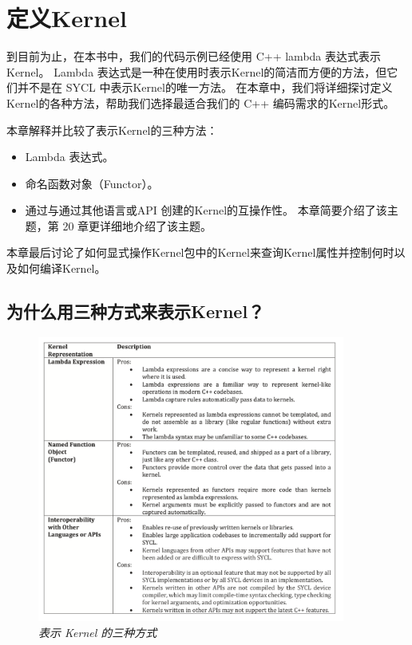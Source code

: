 \section{定义Kernel}
到目前为止，在本书中，我们的代码示例已经使用 C++ lambda 表达式表示Kernel。 
Lambda 表达式是一种在使用时表示Kernel的简洁而方便的方法，但它们并不是在 SYCL 中表示Kernel的唯一方法。 
在本章中，我们将详细探讨定义Kernel的各种方法，帮助我们选择最适合我们的 C++ 编码需求的Kernel形式。

本章解释并比较了表示Kernel的三种方法：

\begin{itemize}
	\item Lambda 表达式。

	\item 命名函数对象（Functor）。

	\item 通过与通过其他语言或API 创建的Kernel的互操作性。 本章简要介绍了该主题，第 20 章更详细地介绍了该主题。
\end{itemize}

本章最后讨论了如何显式操作Kernel包中的Kernel来查询Kernel属性并控制何时以及如何编译Kernel。


\subsection{为什么用三种方式来表示Kernel？}
\begin{figure}[H]
	\centering
	\includegraphics[width=0.9\textwidth]{figs/F10.1.png}
	\caption{\textit{表示 Kernel 的三种方式 }}
\end{figure}

